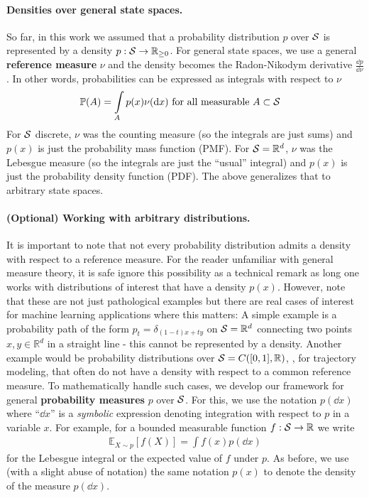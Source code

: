 \documentclass{fairmeta}
\newcommand{\highlight}[1]{{\color{metablue} \textbf{#1}}}
\numberwithin{equation}{section}
\begin{document}
\paragraph{Densities over general state spaces.} So far, in this work we assumed that a probability distribution $p$ over ${\mathcal{S}}$ is represented by a density $p:{\mathcal{S}}\to\mathbb{R}_{\geq 0}$. For general state spaces, we use a general \highlight{reference measure} $\nu$ and the density becomes the Radon-Nikodym derivative $\frac{\dd p}{\dd \nu}$. In other words, probabilities can be expressed as integrals with respect to $\nu$
\begin{align*}
    {\mathbb{P}}(A) &= \int\limits_{A}p(x)\nu(\mathrm{d} x)\text{ for all measurable }A\subset {\mathcal{S}}
\end{align*}
For ${\mathcal{S}}$ discrete, $\nu$ was the counting measure (so the integrals are just sums) and $p(x)$ is just the probability mass function (PMF). For ${\mathcal{S}}=\mathbb{R}^d$, $\nu$ was the Lebesgue measure (so the integrals are just the ``usual'' integral) and $p(x)$ is just the probability density function (PDF). The above generalizes that to arbitrary state spaces. 


\paragraph{(Optional) Working with arbitrary distributions.} It is important to note that not every probability distribution admits a density with respect to a reference measure. For the reader unfamiliar with general measure theory, it is safe ignore this possibility as a technical remark as long one works with distributions of interest that have a density $p(x)$. However, note that these are not just pathological examples but there are real cases of interest for machine learning applications where this matters: A simple  example is a probability path of the form $p_t=\delta_{(1-t)x+ty}$ on ${\mathcal{S}}=\mathbb{R}^d$ connecting two points $x,y\in\mathbb{R}^d$ in a straight line - this cannot be represented by a density. Another example would be probability distributions over ${\mathcal{S}}=C([0,1],\mathbb{R})$, \eg, for trajectory modeling, that often do not have a density with respect to a common reference measure. To mathematically handle such cases, we develop our framework for general \highlight{probability measures} $p$ over ${\mathcal{S}}$. For this, we use the notation $p(\dd x)$ where ``$\dd x$'' is a \emph{symbolic} expression denoting integration with respect to $p$ in a variable $x$. For example, for a bounded measurable function $f:{\mathcal{S}}\to\mathbb{R}$ we write 
\begin{align*}
    \mathbb{E}_{X\sim p}[f(X)] = \int f(x)p(\dd x)
\end{align*}
for the Lebesgue integral or the expected value of $f$ under $p$. As before, we use (with a slight abuse of notation) the same notation $p(x)$ to denote the density of the measure $p(\dd x)$.
\end{document}
